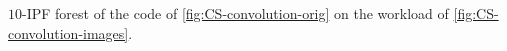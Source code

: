 \label{fig:CS-convolution-kipf} $10$-IPF forest of the code of \myfigure\ref{fig:CS-convolution-orig} on the workload of \myfigure\ref{fig:CS-convolution-images}.

